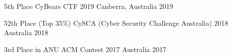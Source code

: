 




 
    {} %
    {} %
    {} %
    {} %





\begin{cvhonors}

  \cvhonor
    {5th Place} %
    {CyBears CTF 2019} %
    {Canberra, Australia} %
    {2019} %

  \cvhonor
    {52th Place (Top 35\%)} %
    {CySCA (Cyber Security Challenge Australia) 2018} %
    {Australia} %
    {2018} %

  \cvhonor
    {3rd Place in ANU} %
    {ACM Contest 2017} %
    {Australia} %
    {2017} %

\end{cvhonors}
